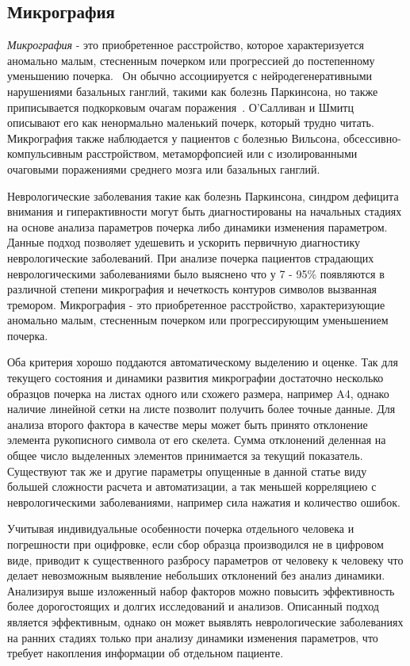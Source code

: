 \subsection{Микрография}
\emph{Микрография} - это приобретенное расстройство, которое характеризуется аномально малым, стесненным почерком или прогрессией до постепенному уменьшению почерка.~\cite{larner_dict_neuro} Он обычно ассоциируется с нейродегенеративными нарушениями базальных ганглий, такими как болезнь Паркинсона, но также приписывается подкорковым очагам поражения~\cite{academic_press_movement_disorders}. О'Салливан и Шмитц описывают его как ненормально маленький почерк, который трудно читать.~\cite{o_sullivan} Микрография также наблюдается у пациентов с болезнью Вильсона, обсессивно-компульсивным расстройством, метаморфопсией или с изолированными очаговыми поражениями среднего мозга или базальных ганглий.~\cite{kinematic_hardwrittung_analysis}

Неврологические заболевания такие как болезнь Паркинсона, синдром дефицита внимания и гиперактивности могут быть диагностированы на начальных стадиях на основе анализа параметров почерка либо динамики изменения параметром. Данные подход позволяет удешевить и ускорить первичную диагностику неврологические заболеваний.
При анализе почерка пациентов страдающих неврологическими заболеваниями было выяснено что у 7 - 95\% появляются в различной степени микрография и нечеткость контуров символов вызванная тремором. Микрография - это приобретенное расстройство, характеризующие аномально малым, стесненным почерком или прогрессирующим уменьшением почерка.

Оба критерия хорошо поддаются автоматическому выделению и оценке. Так для текущего состояния и динамики развития микрографии достаточно несколько образцов почерка на листах одного или схожего размера, например A4, однако наличие линейной сетки на листе позволит получить более точные данные.
Для анализа второго фактора в качестве меры может быть принято отклонение элемента рукописного символа от его скелета. Сумма отклонений деленная на общее число выделенных элементов принимается за текущий показатель.
Существуют так же и другие параметры опущенные в данной статье виду большей сложности расчета и автоматизации, а так меньшей корреляциею с неврологическими заболеваниями, например сила нажатия и количество ошибок.

Учитывая индивидуальные особенности почерка отдельного человека и погрешности при оцифровке, если сбор образца производился не в цифровом виде, приводит к существенного разбросу параметров от человеку к человеку что делает невозможным выявление небольших отклонений без анализ динамики.
Анализируя выше изложенный набор факторов можно повысить эффективность более дорогостоящих и долгих исследований и анализов.
Описанный подход является эффективным, однако он может выявлять неврологические заболеваниях на ранних стадиях только при анализу динамики изменения параметров, что требует накопления информации об отдельном пациенте.

